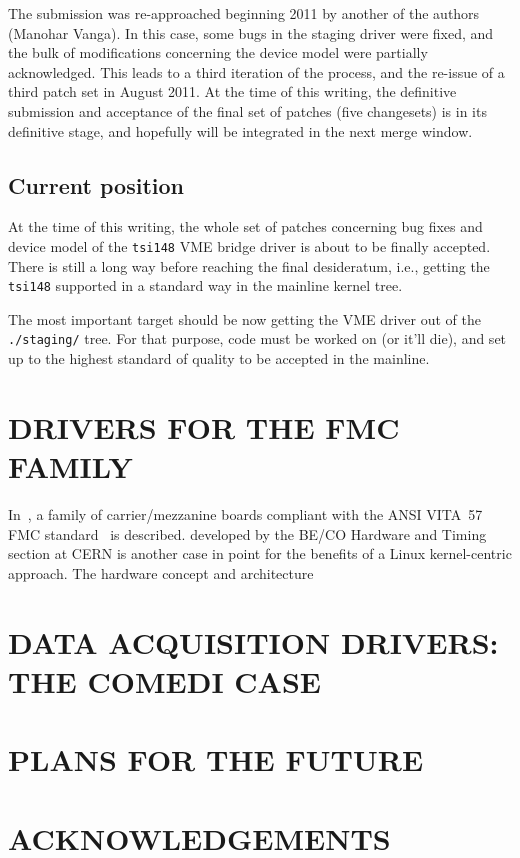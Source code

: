 \documentclass{JAC2003}
\begin{document}
The submission was re-approached beginning 2011 by another of the
authors (Manohar Vanga). In this case, some bugs in the staging driver
were fixed, and the bulk of modifications concerning the device model
were partially acknowledged. This leads to a third iteration of the
process, and the re-issue of a third patch set in August 2011. At the
time of this writing, the definitive submission and acceptance of the
final set of patches (five changesets) is in its definitive stage, and
hopefully will be integrated in the next merge window.

\subsection{Current position}

At the time of this writing, the whole set of patches concerning bug
fixes and device model of the \verb|tsi148| VME bridge driver is
about to be finally accepted. There is still a long way before reaching
the final desideratum, i.e., getting the \verb|tsi148|
supported in a standard way in the mainline kernel tree.
\begin{Itemize}
\item The most important target should be now getting the VME driver out
of the \verb|./staging/| tree. For that purpose, code must be worked on
(or it'll die), and set up to the highest standard of quality to be
accepted in the mainline.
\end{Itemize}

\section{DRIVERS FOR THE FMC FAMILY}

In~\cite{fpga-fmc}, a family of carrier/mezzanine boards compliant with 
the ANSI VITA~57 FMC standard~\cite{} is described.
developed by the BE/CO Hardware and Timing section at CERN is
another case in point for the benefits of a Linux kernel-centric
approach. The hardware concept and architecture



\section{DATA ACQUISITION DRIVERS: THE COMEDI CASE}
\section{PLANS FOR THE FUTURE}
\section{ACKNOWLEDGEMENTS}
\end{document}
